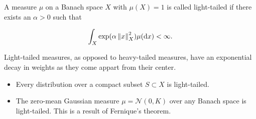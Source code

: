 \begin{definition}
  A measure $\mu$ on a Banach space $X$ with $\mu(X) = 1$ is called light-tailed if there exists an $\alpha > 0$ such that

  \begin{equation*}
    \int_X\exp(\alpha\left\lVert x\right\rVert^2_X)\mu(\text{d} x) < \infty.
  \end{equation*}
\end{definition}

\begin{remarks} Light-tailed measures, as opposed to heavy-tailed measures, have an exponential decay in weights as they come appart from their center. 

  \begin{itemize}
  \item Every distribution over a compact subset $S \subset X$ is light-tailed.
  \item The zero-mean Gaussian measure $\mu = \mathcal{N}(0, K)$ over any Banach space is light-tailed. This is a result of Fernique's theorem.
  \end{itemize}
\end{remarks}

